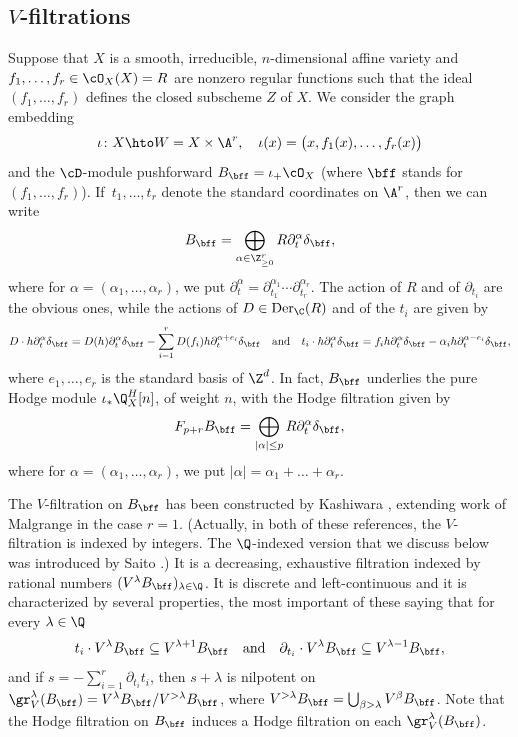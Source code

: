 \subsection{$V$-filtrations}\label{section_V_filtration} Suppose that $X$ is a smooth, irreducible, $n$-dimensional affine variety and $f_1,\ldots,f_r\in\cO_X(X)=R$ are nonzero regular functions such that the ideal
$(f_1,\ldots,f_r)$ defines the closed subscheme $Z$ of $X$. We consider the graph embedding
\[\iota\colon X\hto W=X\times\A^r,\quad \iota(x)=\big(x,f_1(x),\ldots,f_r(x)\big)\]
and the $\cD$-module pushforward $B_{\bff}=\iota_+\cO_X$ (where $\bff$ stands for $(f_1,\ldots,f_r)$). If~$t_1,\ldots,t_r$ denote the standard coordinates on
$\A^r$, then we can write
\[B_{\bff}=\bigoplus_{\alpha\in \Z_{\geq 0}^r}R\partial_t^{\alpha}\delta_{\bff},\]
where for $\alpha=(\alpha_1,\ldots,\alpha_r)$, we put $\partial_t^{\alpha}=\partial_{t_1}^{\alpha_1}\cdots \partial_{t_r}^{\alpha_r}$.
The action of $R$ and of $\partial_{t_i}$ are the obvious ones, while the actions of $D\in \mathrm{Der}_{\C}(R)$ and of the $t_i$ are given by
\[D\cdot h\partial_t^{\alpha}\delta_{\bff}=D(h)\partial_t^{\alpha}\delta_{\bff}-\sum_{i=1}^rD(f_i)h\partial_t^{\alpha+e_i}\delta_{\bff}\quad\text{and}\quad
t_i\cdot h\partial_t^{\alpha}\delta_{\bff}=f_ih\partial_t^{\alpha}\delta_{\bff}-\alpha_ih\partial_t^{\alpha-e_i}\delta_{\bff},\]
where $e_1,\ldots,e_r$ is the standard basis of $\Z^d$. In fact, $B_{\bff}$ underlies the pure Hodge module $\iota_*\Q_X^H[n]$, of weight $n$,
with the Hodge filtration given by
\[F_{p+r}B_{\bff}=\bigoplus_{|\alpha|\leq p}R\partial_t^{\alpha}\delta_{\bff},\]
where for $\alpha=(\alpha_1,\ldots,\alpha_r)$, we put $|\alpha|=\alpha_1+\ldots+\alpha_r$.

The $V$-filtration on $B_{\bff}$ has been constructed by Kashiwara \cite{Kashiwara}, extending work of Malgrange \cite{Malgrange} in the case $r=1$.
(Actually, in both of these references, the $V$-filtration is indexed by integers. The $\Q$-indexed version that we discuss below was introduced by Saito \cite{Saito_GM}.)
It is a decreasing, exhaustive filtration indexed by rational numbers $(V^{\lambda}B_{\bff})_{\lambda\in\Q}$. It is discrete and left-continuous and
it is characterized by several properties, the most important of these saying that for every $\lambda\in\Q$
\[t_i\cdot V^{\lambda}B_{\bff}\subseteq V^{\lambda+1}B_{\bff}\quad\text{and}\quad \partial_{t_i}\cdot V^{\lambda}B_{\bff}\subseteq V^{\lambda-1}B_{\bff},\]
and if $s=-\sum_{i=1}^r\partial_{t_i}t_i$, then $s+\lambda$ is nilpotent on $\gr^{\lambda}_V(B_{\bff})=V^{\lambda}B_{\bff}/V^{>\lambda}B_{\bff}$,
where $V^{>\lambda}B_{\bff}=\bigcup_{\beta>\lambda}V^{\beta}B_{\bff}$. Note that the Hodge filtration on $B_{\bff}$ induces a Hodge filtration
on each $\gr_V^{\lambda}(B_{\bff})$.

